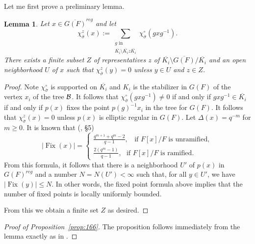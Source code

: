 \documentclass[12pt,letterpaper]{book}
\theoremstyle{plain}
\newtheorem{lemma}[theorem]{Lemma}
\theoremstyle{definition}
\theoremstyle{remark}
\theoremstyle{remark}
\begin{document}
Let me first prove a preliminary lemma.
\begin{lemma} Let $x\in \overline{G(F)}^{reg}$ and let
$$
\chi_{\overline{\sigma}}^z(x):=\sum_{\substack{ g \text{ in }\\
\overline{K_i}\setminus\overline{K_i}z\overline{K_i}}}
\chi_{\overline{\sigma}}^\circ (gxg^{-1}).
$$
There exists a finite subset $Z$ of representatives $z$ of
$\overline{K_i}\setminus\overline{G(F)}/\overline{K_i}$
and an open neighborhood $U$ of $x$ such that
$\chi_{\overline{\sigma}}^z(y)=0$ unless $y\in U$ and $z\in Z$.
\end{lemma}
\begin{proof} Note $\chi_{\overline{\sigma}}^\circ$ is supported
on $\overline{K_i}$ and $K_i$ is the stabilizer in $G(F)$ of the vertex
$x_i$ of the tree ${\cal{B}}$.
It follows that $\chi_{\overline{\sigma}}^\circ (gxg^{-1})\not= 0$
if and only if $gxg^{-1}\in \overline{K_i}$ if and only if
$p(x)$ fixes the point $p(g)^{-1}x_i$ in the tree for $G(F)$.
It follows that
$\chi_{\overline{\sigma}}^z (x)= 0$ unless $p(x)$ is elliptic regular
in $G(F)$. Let $\Delta (x)=q^{-m}$ for $m\geq 0$. It is known that
(\cite{L4}, \S 5)
\begin{equation}
|\operatorname{Fix}(x)|=
\left\{ \begin{array}{c}
\frac{q^{m+1}+q^m-2}{q-1},\ \ \ \ \text{if $F[x]/F$ is unramified},\\
\frac{2(q^m-1)}{q-1},\ \ \ \text{if $F[x]/F$ is ramified}.
\end{array} \right.
\end{equation}
From this formula, it follows that there is a neighborhood $U'$
of $p(x)$ in $G(F)^{reg}$ and a number $N=N(U')<\infty$
such that, for all $y\in U'$, we have $|\operatorname{Fix}(y)|\leq N$.
In other words, the fixed point formula above implies that the
number of fixed points is locally uniformly bounded.

From this we obtain a finite set $Z$ as desired.
\end{proof}

\begin{proof}[Proof of Proposition~\ref{prop:166}]
The proposition follows immediately from
the lemma exactly as in \cite[p.~213]{Kut}.
\end{proof}
\end{document}
